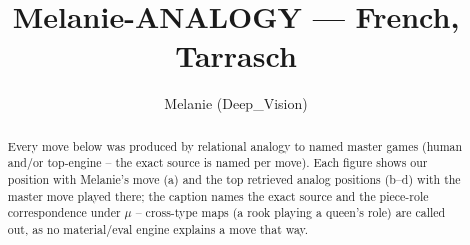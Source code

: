 \documentclass[11pt]{article}
\title{Melanie-ANALOGY — French, Tarrasch}
\author{Melanie (Deep\_Vision)}
\date{}
\begin{document}
\maketitle

\begin{abstract}Every move below was produced by relational analogy to named master games (human and/or top-engine -- the exact source is named per move). Each figure shows our position with Melanie's move (a) and the top retrieved analog positions (b--d) with the master move played there; the caption names the exact source and the piece-role correspondence under $\mu$ -- cross-type maps (a rook playing a queen's role) are called out, as no material/eval engine explains a move that way.\end{abstract}

\begin{figure}[p]\centering
\begin{subfigure}{0.46\textwidth}\centering
\resizebox{\linewidth}{!}{%
\newchessgame
\chessboard[
  setfen={r1bqkb1r/pp1n1ppp/2n1p3/2ppP3/3P4/2PB4/PP1N1PPP/R1BQK1NR w KQkq - 1 7},
  showmover=false,
  pgfstyle=straightmove, color=movearrow, markmove={d2-f1}
]}
\caption{}
\end{subfigure}\hfill
\begin{subfigure}{0.46\textwidth}\centering
\resizebox{\linewidth}{!}{%
\newchessgame
\chessboard[
  setfen={r1bqkbnr/pp3ppp/2n1p3/2ppP3/3P4/2P5/PP3PPP/RNBQKBNR w KQkq - 1 5},
  showmover=false,
  pgfstyle=straightmove, color=movearrow, markmove={f1-e2}
]}
\caption{}
\end{subfigure}
\\[4pt]
\begin{subfigure}{0.46\textwidth}\centering
\resizebox{\linewidth}{!}{%
\newchessgame
\chessboard[
  setfen={r1bqkbnr/pp3ppp/2n1p3/2ppP3/3P4/2P5/PP3PPP/RNBQKBNR w KQkq - 1 5},
  showmover=false,
  pgfstyle=straightmove, color=movearrow, markmove={f1-e2}
]}
\caption{}
\end{subfigure}\hfill
\begin{subfigure}{0.46\textwidth}\centering
\resizebox{\linewidth}{!}{%
\newchessgame
\chessboard[
  setfen={r1bqkb1r/pp1n1ppp/2n1p3/2ppP3/3P1P2/2P5/PP1N2PP/R1BQKBNR w KQkq - 1 7},
  showmover=false,
  pgfstyle=straightmove, color=movearrow, markmove={d2-f3}
]}
\caption{}
\end{subfigure}

\end{figure}
\end{document}
